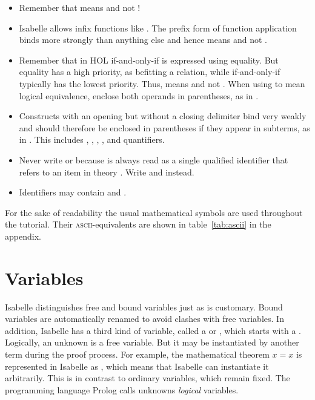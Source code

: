 \begin{itemize}
\item
Remember that  means  and not !
\item
Isabelle allows infix functions like \isa{+}. The prefix form of function
application binds more strongly than anything else and hence 
means  and not .
\item Remember that in HOL if-and-only-if is expressed using equality.  But
  equality has a high priority, as befitting a relation, while if-and-only-if
  typically has the lowest priority.  Thus,  means  and not
  . When using \isa{=} to mean
  logical equivalence, enclose both operands in parentheses, as in .
\item
Constructs with an opening but without a closing delimiter bind very weakly
and should therefore be enclosed in parentheses if they appear in subterms, as
in . This includes ,
, , \isa{\isasymlambda}, and quantifiers.
\item
Never write  or 
because  is always read as a single qualified identifier that
refers to an item  in theory . Write
 and  instead.
\item Identifiers may contain \isa{_} and .
\end{itemize}

For the sake of readability the usual mathematical symbols are used throughout
the tutorial. Their \textsc{ascii}-equivalents are shown in table~\ref{tab:ascii} in
the appendix.


\section{Variables}
\label{sec:variables}

Isabelle distinguishes free and bound variables just as is customary. Bound
variables are automatically renamed to avoid clashes with free variables. In
addition, Isabelle has a third kind of variable, called a  or , which starts
with a .  Logically, an unknown is a free variable. But it may be
instantiated by another term during the proof process. For example, the
mathematical theorem $x = x$ is represented in Isabelle as ,
which means that Isabelle can instantiate it arbitrarily. This is in contrast
to ordinary variables, which remain fixed. The programming language Prolog
calls unknowns {\em logical\/} variables.

